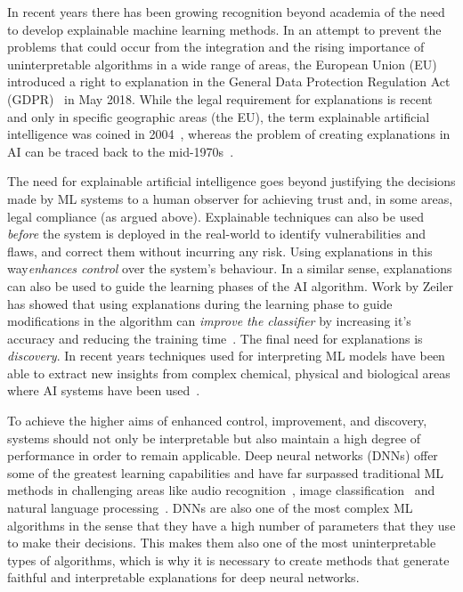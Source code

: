 In recent years there has been growing recognition beyond academia of the need to develop explainable machine learning methods. In an attempt to prevent the problems that could occur from the integration and the rising importance of uninterpretable algorithms in a wide range of areas, the European Union (EU) introduced a right to explanation in the General Data Protection Regulation Act (GDPR)~\cite{GoodmanF17} in May 2018. While the legal requirement for explanations is recent and only in specific geographic areas (the EU), the term explainable artificial intelligence was coined in 2004~\cite{LentFM04}, whereas the problem of creating explanations in AI can be traced back to the mid-1970s~\cite{moore1988explanation}. 

The need for explainable artificial intelligence goes beyond justifying the decisions made by ML systems to a human observer for achieving trust and, in some areas, legal compliance (as argued above). Explainable techniques can also be used \textit{before} the system is deployed in the real-world to identify vulnerabilities and flaws, and correct them without incurring any risk. Using explanations in this way\textit{enhances control} over the system's behaviour. In a similar sense, 
explanations can also be used to guide the learning phases of the AI algorithm. Work by Zeiler has showed that using explanations during the learning phase to guide modifications in the algorithm can \textit{improve the classifier} by increasing it's accuracy and reducing the training time~\cite{ZeilerF14}. The final need for explanations is \textit{discovery}. In recent years techniques used for interpreting ML models have been able to extract new insights from complex chemical, physical and biological areas where AI systems have been used~\cite{khan2001classification, schutt2017quantum}. 

To achieve the higher aims of enhanced control, improvement, and discovery, systems should not only be interpretable but also maintain a high degree of performance in order to remain applicable. Deep neural networks (DNNs) offer some of the greatest learning capabilities and have far surpassed traditional ML methods in challenging areas like audio recognition~\cite{ChiuSWPNCKWRGJL18}, image classification~\cite{KrizvskySH17} and natural language processing~\cite{McCannBXS17}. DNNs are also one of the most complex ML algorithms in the sense that they have a high number of parameters that they use to make their decisions. This makes them also one of the most uninterpretable types of algorithms, which is why it is necessary to create methods that generate faithful and interpretable explanations for deep neural networks. 



